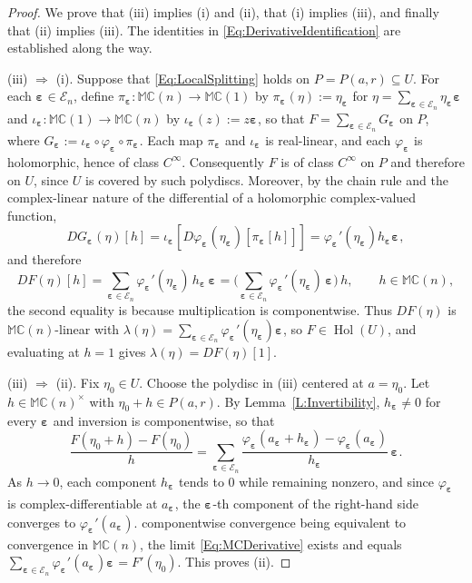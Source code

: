 \documentclass[10pt,a4paper]{amsart}
\DeclareMathOperator{\hol}{Hol}
\newcommand{\Ra}{\Rightarrow}
\newcommand{\bep}[1]{\bm{\varepsilon_{#1}}}
\newcommand{\mC}{\mathbb{C}}
\newcommand{\mM}{\mathbb{M}}
\newcommand{\ra}{\rightarrow}
\begin{document}
    \begin{proof}
    We prove that (iii) implies (i) and (ii), that (i) implies (iii), and
    finally that (ii) implies (iii). The identities in
    \eqref{Eq:DerivativeIdentification} are established along the way.

    (iii) $\Ra$ (i). Suppose that \eqref{Eq:LocalSplitting} holds on
    $P = P ( a , r ) \subseteq U$. 
    For each $\bep{} \in \mathcal{E}_n$, define $\pi_{\bep{}} : \mM \mC (n) \ra \mM \mC (1)$ by $\pi_{\bep{}} (\eta) := \eta_{\bep{}}$ for $\eta = \sum_{\bep{} \in \mathcal{E}_n} \eta_{\bep{}} \bep{}$ and $\iota_{\bep{}} : \mM \mC (1) \ra \mM \mC (n)$ by $\iota_{\bep{}} (z) := z \bep{}$, so that $F = \sum_{\bep{} \in \mathcal{E}_n} G_{\bep{}}$ on $P$, where $G_{\bep{}} := \iota_{\bep{}} \circ \varphi_{\bep{}} \circ \pi_{\bep{}}$. 
    Each map $\pi_{\bep{}}$ and $\iota_{\bep{}}$ is real-linear, and each $\varphi_{\bep{}}$ is holomorphic, hence of class $C^\infty$. Consequently $F$ is of class $C^\infty$ on $P$ and therefore on $U$, since $U$ is covered by such polydiscs. 
    Moreover, by the chain rule and the complex-linear nature of the differential of a holomorphic complex-valued function, 
    $$
        DG_{\bep{}} (\eta) [h] = \iota_{\bep{}} [ D\varphi_{\bep{}} (\eta_{\bep{}}) [ \pi_{\bep{}} [h]]] = \varphi_{\bep{}}' (\eta_{\bep{}}) h_{\bep{}} \bep{} ,
    $$
    and therefore
        \[
        DF (\eta ) [ h ]
        = \sum_{\bep{} \in \mathcal{E}_n}\varphi_{\bep{}} ' ( \eta_{\bep{}} )\, h_{\bep{}}\, \bep{}
        = \Big( \sum_{\bep{} \in \mathcal{E}_n} \varphi_{\bep{}} ' ( \eta_{\bep{}} )\, \bep{} \Big)\, h ,
        \qquad h \in \mM \mC(n) ,
        \]
    the second equality is because multiplication is componentwise. Thus
    $DF (\eta )$ is $\mM \mC(n)$-linear with
    $\lambda (\eta ) = \sum_{\bep{} \in \mathcal{E}_n} \varphi_{\bep{}} ' ( \eta_{\bep{}} ) \bep{}$, so
    $F \in \hol (U)$, and evaluating at $h = 1$ gives
    $\lambda (\eta ) = DF (\eta ) [ 1 ]$.

    (iii) $\Ra$ (ii). Fix $\eta_0 \in U$. Choose the polydisc in (iii) centered at $a = \eta_0$. Let $h \in \mM \mC(n)^\times$
    with $\eta_0 + h \in P ( a , r )$. By Lemma~\ref{L:Invertibility},
    $h_{\bep{}} \neq 0$ for every $\bep{}$ and inversion is componentwise, so that
        \[
        \frac{F (\eta_0 + h ) - F (\eta_0 )}{h} 
        = \sum_{\bep{} \in \mathcal{E}_n}
        \frac{ \varphi_{\bep{}} ( a_{\bep{}} + h_{\bep{}} ) - \varphi_{\bep{}} ( a_{\bep{}} ) }{ h_{\bep{}} }\,
        \bep{} .
        \]
    As $h \ra 0$, each component $h_{\bep{}}$ tends to $0$ while remaining nonzero,
    and since $\varphi_{\bep{}}$ is complex-differentiable at $a_{\bep{}}$, the ${\bep{}}$-th
    component of the right-hand side converges to $\varphi_{\bep{}} ' ( a_{\bep{}} )$.
    componentwise convergence being equivalent to convergence in
    $\mM \mC(n)$, the limit \eqref{Eq:MCDerivative} exists and equals
    $\sum_{\bep{} \in \mathcal{E}_n} \varphi_{\bep{}} ' ( a_{\bep{}} ) \bep{} = F'(\eta_0)$. This proves
    (ii).


\end{proof}
\end{document}
